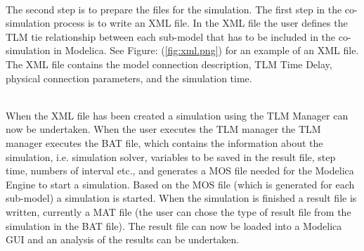 ~\\The second step is to prepare the files for the simulation. 
The first step in the co-simulation process is to write an XML file. 
In the XML file the user defines the TLM tie relationship between each sub-model that has to be included in the co-simulation in Modelica. 
See Figure: (\ref{fig:xml.png}) for an example of an XML file. 
The XML file contains the model connection description, TLM Time Delay, physical connection parameters, and the simulation time.

~\\When the XML file has been created a simulation using the TLM Manager can now be undertaken. 
When the user executes the TLM manager the TLM manager executes the BAT file, which contains the information about the simulation, i.e. simulation solver, variables to be saved in the result file, step time, numbers of interval etc., and generates a MOS file needed for the Modelica Engine to start a simulation. 
Based on the MOS file (which is generated for each sub-model) a simulation is started. 
When the simulation is finished a result file is written, currently a MAT file (the user can chose the type of result file from the simulation in the BAT file). 
The result file can now be loaded into a Modelica GUI and an analysis of the results can be undertaken.


